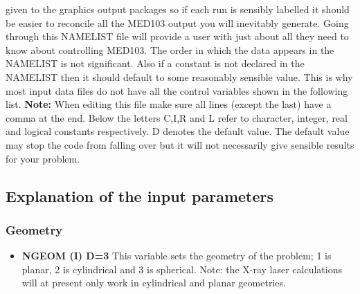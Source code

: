 given to the graphics output packages so if each run is sensibly
labelled it should be easier to reconcile all the MED103 output
you will inevitably generate.
Going through this NAMELIST file will provide
a user with just about all they need to know about controlling
MED103. The order in which the data appears in the NAMELIST
is not significant.
Also if a constant is not declared in the NAMELIST then it should
default to some reasonably sensible value. This is why most input
data files do not have all the control
variables shown in the following list.
\newline 
{\bf Note: } When editing this file make sure all lines (except the last)
have a comma at the end.
\newline 
Below the letters
C,I,R and L refer to character, integer, real and logical constants
respectively. D denotes the default value. The default value
may stop the code from falling over but it will not necessarily give
sensible results for your problem.

\subsection{Explanation of the input parameters}
\subsubsection{\bf Geometry}
\begin{itemize}
\item {\bf NGEOM (I) D=3}
This variable sets the
geometry of the problem; 1 is planar, 2 is cylindrical and 3 is
spherical. Note: the X-ray laser calculations will at present
only work in cylindrical and planar geometries.
\end{itemize}
